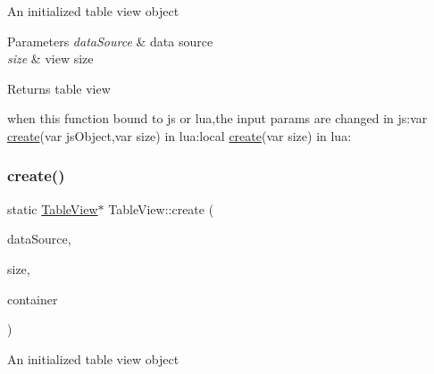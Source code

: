 An initialized table view object


\begin{DoxyParams}{Parameters}
{\em data\+Source} & data source \\
\hline
{\em size} & view size \\
\hline
\end{DoxyParams}
\begin{DoxyReturn}{Returns}
table view 
\begin{DoxyCode}
when \textcolor{keyword}{this} \textcolor{keyword}{function} bound to js or lua,the input params are changed
in js:var \hyperlink{classTableView_a298f6ec9b9dc31b643b2027e3c91d6a1}{create}(var jsObject,var size)
in lua:local \hyperlink{classTableView_a298f6ec9b9dc31b643b2027e3c91d6a1}{create}(var size)
in lua:
\end{DoxyCode}
 
\end{DoxyReturn}
\mbox{\label{classTableView_a70a35ba0d9947307b762ee96e71dfa76}} 
\subsubsection{\texorpdfstring{create()}{create()}\hspace{0.1cm}{\footnotesize\ttfamily [5/6]}}
{\footnotesize\ttfamily static \hyperlink{classTableView}{Table\+View}$\ast$ Table\+View\+::create (\begin{DoxyParamCaption}\item[{\hyperlink{classTableViewDataSource}{Table\+View\+Data\+Source} $\ast$}]{data\+Source,  }\item[{\hyperlink{classSize}{Size}}]{size,  }\item[{\hyperlink{classNode}{Node} $\ast$}]{container }\end{DoxyParamCaption})\hspace{0.3cm}{\ttfamily [static]}}

An initialized table view object


